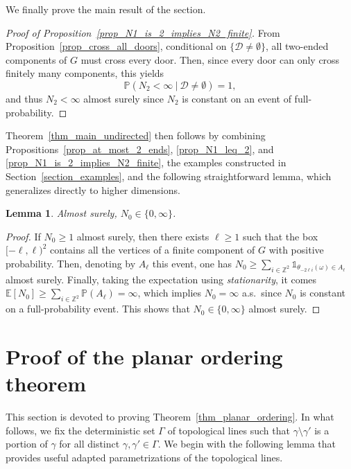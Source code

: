 \documentclass[a4paper, 11pt]{article} %
\theoremstyle{plain}
\newtheorem{lemma}[theorem]{Lemma}
\newcommand{\D}{\mathcal D}
\newcommand{\E}{\mathbb{E}}
\newcommand{\Z}{\mathbb{Z}}
\newcommand{\1}{\mathds 1}
\renewcommand{\P}{\mathbb{P}}
\numberwithin{equation}{section}
\begin{document}
We finally prove the main result of the section. 


\begin{proof}[Proof of Proposition~\ref{prop_N1_is_2_implies_N2_finite}]
    From Proposition~\ref{prop_cross_all_doors}, conditional on $\{\D\neq\emptyset\}$, all two-ended components of $G$ must cross every door. Then, since every door can only cross finitely many components, this yields
        \[\P(N_2<\infty~|~\D\neq\emptyset)=1,\]
    and thus $N_2<\infty$ almost surely since $N_2$ is constant on an event of full-probability.
\end{proof}


Theorem~\ref{thm_main_undirected} then follows by combining Propositions~\ref{prop_at_most_2_ends}, \ref{prop_N1_leq_2}, and \ref{prop_N1_is_2_implies_N2_finite}, the examples constructed in Section~\ref{section_examples}, and the following straightforward lemma, which generalizes directly to higher dimensions.


\begin{lemma}
    Almost surely, $N_0\in\{0,\infty\}$.
\end{lemma}

\begin{proof}
    If $N_0\geq1$ almost surely, then there exists $\ell\geq1$ such that the box $[-\ell,\ell)^2$ contains all the vertices of a finite component of $G$ with positive probability. Then, denoting by $A_\ell$ this event, one has $N_0\geq\sum_{i\in\Z^2}\1_{\theta_{-2\ell i}(\omega)\in A_\ell}$ almost surely. Finally, taking the expectation using \emph{stationarity}, it comes $\E[N_0]\geq\sum_{i\in\Z^2}\P(A_\ell)=\infty$, which implies $N_0=\infty$ a.s.\ since $N_0$ is constant on a full-probability event. This shows that $N_0\in\{0,\infty\}$ almost surely.
\end{proof}


\section{Proof of the planar ordering theorem}

\label{section_planar_ordering}


This section is devoted to proving Theorem~\ref{thm_planar_ordering}. In what follows, we fix the deterministic set $\Gamma$ of topological lines such that $\gamma\setminus\gamma'$ is a portion of $\gamma$ for all distinct $\gamma,\gamma'\in\Gamma$. We begin with the following lemma that provides useful adapted parametrizations of the topological lines.
\end{document}
